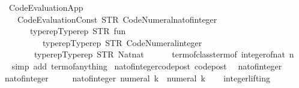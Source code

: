\begin{isabellebody}
\ \ \ Code{\isacharunderscore}Evaluation{\isachardot}App\isanewline
\ \ \ \ \ {\isacharparenleft}Code{\isacharunderscore}Evaluation{\isachardot}Const\ {\isacharparenleft}STR\ {\isacharprime}{\isacharprime}Code{\isacharunderscore}Numeral{\isachardot}nat{\isacharunderscore}of{\isacharunderscore}integer{\isacharprime}{\isacharprime}{\isacharparenright}\isanewline
\ \ \ \ \ \ \ \ {\isacharparenleft}typerep{\isachardot}Typerep\ {\isacharparenleft}STR\ {\isacharprime}{\isacharprime}fun{\isacharprime}{\isacharprime}{\isacharparenright}\isanewline
\ \ \ \ \ \ \ \ \ \ \ {\isacharbrackleft}typerep{\isachardot}Typerep\ {\isacharparenleft}STR\ {\isacharprime}{\isacharprime}Code{\isacharunderscore}Numeral{\isachardot}integer{\isacharprime}{\isacharprime}{\isacharparenright}\ {\isacharbrackleft}{\isacharbrackright}{\isacharcomma}\isanewline
\ \ \ \ \ \ \ \ \ typerep{\isachardot}Typerep\ {\isacharparenleft}STR\ {\isacharprime}{\isacharprime}Nat{\isachardot}nat{\isacharprime}{\isacharprime}{\isacharparenright}\ {\isacharbrackleft}{\isacharbrackright}{\isacharbrackright}{\isacharparenright}{\isacharparenright}\isanewline
\ \ \ \ \ {\isacharparenleft}term{\isacharunderscore}of{\isacharunderscore}class{\isachardot}term{\isacharunderscore}of\ {\isacharparenleft}integer{\isacharunderscore}of{\isacharunderscore}nat\ n{\isacharparenright}{\isacharparenright}{\isachardoublequoteclose}\isanewline
%
\isadelimproof
\ \ %
\endisadelimproof
%
\isatagproof
{}\isamarkupfalse%
\ {\isacharparenleft}simp\ add{\isacharcolon}\ term{\isacharunderscore}of{\isacharunderscore}anything{\isacharparenright}%
\endisatagproof
{\isafoldproof}%
%
\isadelimproof
\isanewline
%
\endisadelimproof
\isanewline
{}\isamarkupfalse%
\ nat{\isacharunderscore}of{\isacharunderscore}integer{\isacharunderscore}code{\isacharunderscore}post\ {\isacharbrackleft}code{\isacharunderscore}post{\isacharbrackright}{\isacharcolon}\isanewline
\ \ {\isachardoublequoteopen}nat{\isacharunderscore}of{\isacharunderscore}integer\ {}\ {\isacharequal}\ {}{\isachardoublequoteclose}\isanewline
\ \ {\isachardoublequoteopen}nat{\isacharunderscore}of{\isacharunderscore}integer\ {}\ {\isacharequal}\ {}{\isachardoublequoteclose}\isanewline
\ \ {\isachardoublequoteopen}nat{\isacharunderscore}of{\isacharunderscore}integer\ {\isacharparenleft}numeral\ k{\isacharparenright}\ {\isacharequal}\ numeral\ k{\isachardoublequoteclose}\isanewline
\ \ \isamarkupfalse%
\ integer{\isachardot}lifting%
\isadelimproof
\ %
\endisadelimproof
%
\isatagproof
{}\isamarkupfalse%

\end{isabellebody}
